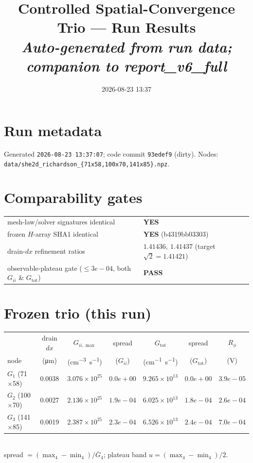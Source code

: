 \documentclass[11pt]{article}
\title{\textbf{Controlled Spatial-Convergence Trio --- Run Results}\\[3pt]
\large\textit{Auto-generated from run data; companion to report\_v6\_full}}
\date{2026-08-23 13:37}\author{}
\begin{document}
\maketitle\vspace{-2.2em}
\begin{center}\end{center}
\section*{Run metadata}
Generated \texttt{2026-08-23 13:37:07}; code commit \texttt{93edef9} (dirty). Nodes:
\texttt{data/she2d\_richardson\_\{71x58,100x70,141x85\}.npz}.
\section*{Comparability gates}
\begin{tabular}{ll}\toprule
mesh-law/solver signatures identical & \textbf{YES} \\
frozen $H$-array SHA1 identical & \textbf{YES} (b4319bb03303) \\
drain-$dx$ refinement ratios & $1.41436,\ 1.41437$ (target $\sqrt2=1.41421$) \\
observable-plateau gate ($\le3e-04$, both $G_{ii}$ \& $G_{\mathrm{tot}}$) & \textbf{PASS} \\
\bottomrule\end{tabular}
\section*{Frozen trio (this run)}
\begin{tabular}{lcccccc}\toprule
 & drain $dx$ & $G_{ii,\max}$ & spread & $G_{\mathrm{tot}}$ & spread & $R_\phi$ \\
node & (\si{\micro m}) & (\si{cm^{-3}s^{-1}}) & ($G_{ii}$) & (\si{cm^{-1}s^{-1}}) & ($G_{\mathrm{tot}}$) & (V) \\ \midrule
$G_1$ (71$\times$58) & 0.0038 & $3.076\times10^{25}$ & $0.0e+00$ & $9.265\times10^{13}$ & $0.0e+00$ & $3.9e-05$ \\
$G_2$ (100$\times$70) & 0.0027 & $2.136\times10^{25}$ & $1.9e-04$ & $6.025\times10^{13}$ & $1.8e-04$ & $2.6e-04$ \\
$G_3$ (141$\times$85) & 0.0019 & $2.387\times10^{25}$ & $2.3e-04$ & $6.526\times10^{13}$ & $2.4e-04$ & $7.0e-04$ \\
\bottomrule\end{tabular}\\[4pt]
{\footnotesize spread $=(\max_4-\min_4)/\bar G_4$; plateau band $u=(\max_4-\min_4)/2$.}
\end{document}
